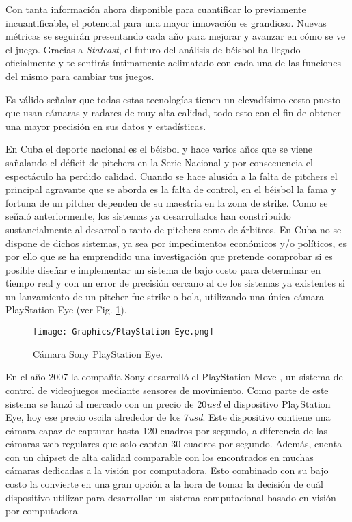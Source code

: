 Con tanta información ahora disponible para cuantificar lo previamente incuantificable, el potencial para una mayor innovación es grandioso. Nuevas métricas se seguirán presentando cada año para mejorar y avanzar en cómo se ve el juego. Gracias a \textit{Statcast}, el futuro del análisis de béisbol ha llegado oficialmente y te sentirás íntimamente aclimatado con cada una de las funciones del mismo para cambiar tus juegos.

Es válido señalar que todas estas tecnologías tienen un elevadísimo costo puesto que usan cámaras y radares de muy alta calidad, todo esto con el fin de obtener una mayor precisión en sus datos y estadísticas.

En Cuba el deporte nacional es el béisbol y hace varios años que se viene sañalando el déficit de pitchers en la Serie Nacional y por consecuencia el espectáculo ha perdido calidad. Cuando se hace alusión a la falta de pitchers el principal agravante que se aborda es la falta de control, en el béisbol la fama y fortuna de un pitcher dependen de su maestría en la zona de strike. Como se señaló anteriormente, los sistemas ya desarrollados han constribuido sustancialmente al desarrollo tanto de pitchers como de árbitros. En Cuba no se dispone de dichos sistemas, ya sea por impedimentos económicos y/o políticos, es por ello que se ha emprendido una investigación que pretende comprobar si es posible diseñar e implementar un sistema de bajo costo para determinar en tiempo real y con un error de precisión cercano al de los sistemas ya existentes si un lanzamiento de un pitcher fue strike o bola, utilizando una única cámara PlayStation Eye \cite{PlayStationEye} (ver Fig. \ref{fig:PlayStationEye}).

\begin{figure}[h!]
    \centering
    \texttt{[image: Graphics/PlayStation-Eye.png]}
    \caption{Cámara Sony PlayStation Eye.}
    \label{fig:PlayStationEye}
\end{figure}

En el año 2007 la compañía Sony desarrolló el PlayStation Move \cite{PlayStationMove}, un sistema de control de videojuegos mediante sensores de movimiento. Como parte de este sistema se lanzó al mercado con un precio de 20\textit{usd} el dispositivo PlayStation Eye, hoy ese precio oscila alrededor de los 7\textit{usd}. Este dispositivo contiene una cámara capaz de capturar hasta 120 cuadros por segundo, a diferencia de las cámaras web regulares que solo captan 30 cuadros por segundo. Además, cuenta con un chipset de alta calidad comparable con los encontrados en muchas cámaras dedicadas a la visión por computadora. Esto combinado con su bajo costo la convierte en una gran opción a la hora de tomar la decisión de cuál dispositivo utilizar para desarrollar un sistema computacional basado en visión por computadora.

